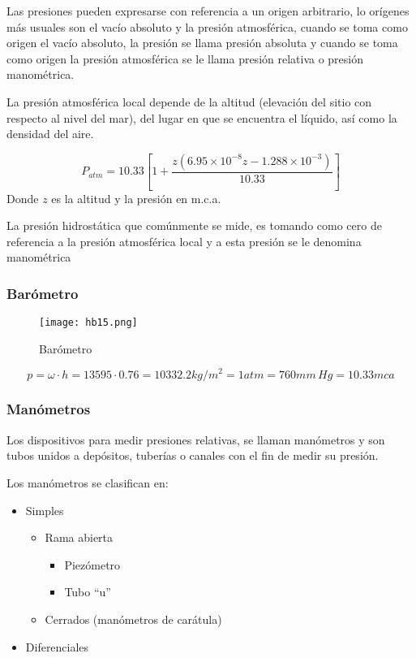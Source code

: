 Las presiones pueden expresarse con referencia a un origen arbitrario, lo orígenes más usuales son el vacío absoluto y la presión atmosférica, cuando se toma como origen el vacío absoluto, la presión se llama presión absoluta y cuando se toma como origen la presión atmosférica se le llama presión relativa o presión manométrica.

La presión atmosférica local depende de la altitud (elevación del sitio con respecto al nivel del mar), del lugar en que se encuentra el líquido, así como la densidad del aire.

\begin{equation}
    P_{atm}=10.33\left[1+\frac{z\left(6.95\times 10^{-8}z-1.288\times 10^{-3}\right)}{10.33}\right]
\end{equation}
Donde $z$ es la altitud y la presión en m.c.a.

La presión hidrostática que comúnmente se mide, es tomando como cero de referencia a la presión atmosférica local y a esta presión se le denomina manométrica

\subsubsection{Barómetro}

\begin{figure}[h!]
  \centerline{\texttt{[image: hb15.png]}}
  \caption{Barómetro}
  \label{hb15}
\end{figure}

\begin{example}
    \begin{equation*}
        p=\omega\cdot h=13595\cdot 0.76=10332.2kg/m^2=1atm=760mm\, Hg=10.33mca
    \end{equation*}
\end{example}

\subsubsection{Manómetros}

Los dispositivos para medir presiones relativas, se llaman manómetros y son tubos unidos a depósitos, tuberías o canales con el fin de medir su presión.

Los manómetros se clasifican en:

\begin{itemize}
    \item Simples
    \begin{itemize}
        \item Rama abierta
        \begin{itemize}
            \item Piezómetro 
            \item Tubo ``u''
        \end{itemize}
        \item Cerrados (manómetros de carátula)
    \end{itemize}
    \item Diferenciales
\end{itemize}

